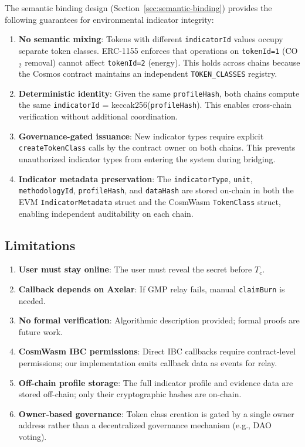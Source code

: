 \documentclass[conference,10pt]{IEEEtran}
\begin{document}
The semantic binding design (Section~\ref{sec:semantic-binding}) provides the following guarantees for environmental indicator integrity:

\begin{enumerate}
    \item \textbf{No semantic mixing}: Tokens with different \texttt{indicatorId} values occupy separate token classes. ERC-1155 enforces that operations on \texttt{tokenId=1} (CO$_2$ removal) cannot affect \texttt{tokenId=2} (energy). This holds across chains because the Cosmos contract maintains an independent \texttt{TOKEN\_CLASSES} registry.
    
    \item \textbf{Deterministic identity}: Given the same \texttt{profileHash}, both chains compute the same \texttt{indicatorId} = keccak256(\texttt{profileHash}). This enables cross-chain verification without additional coordination.
    
    \item \textbf{Governance-gated issuance}: New indicator types require explicit \texttt{createTokenClass} calls by the contract owner on both chains. This prevents unauthorized indicator types from entering the system during bridging.
    
    \item \textbf{Indicator metadata preservation}: The \texttt{indicatorType}, \texttt{unit}, \texttt{methodologyId}, \texttt{profileHash}, and \texttt{dataHash} are stored on-chain in both the EVM \texttt{IndicatorMetadata} struct and the CosmWasm \texttt{TokenClass} struct, enabling independent auditability on each chain.
\end{enumerate}

\subsection{Limitations}

\begin{enumerate}
    \item \textbf{User must stay online}: The user must reveal the secret before $T_c$.
    \item \textbf{Callback depends on Axelar}: If GMP relay fails, manual \texttt{claimBurn} is needed.
    \item \textbf{No formal verification}: Algorithmic description provided; formal proofs are future work.
    \item \textbf{CosmWasm IBC permissions}: Direct IBC callbacks require contract-level permissions; our implementation emits callback data as events for relay.
    \item \textbf{Off-chain profile storage}: The full indicator profile and evidence data are stored off-chain; only their cryptographic hashes are on-chain.
    \item \textbf{Owner-based governance}: Token class creation is gated by a single owner address rather than a decentralized governance mechanism (e.g., DAO voting).
\end{enumerate}
\end{document}
